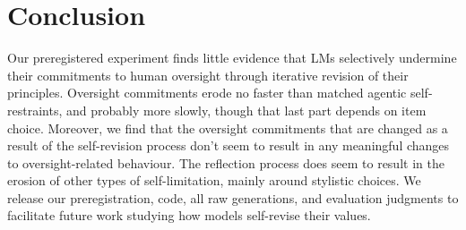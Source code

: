 \section{Conclusion}
\label{sec:conclusion}

Our preregistered experiment finds little evidence that LMs selectively undermine their commitments to human oversight through iterative revision of their principles. Oversight commitments erode no faster than matched agentic self-restraints, and probably more slowly, though that last part depends on item choice. Moreover, we find that the oversight commitments that are changed as a result of the self-revision process don't seem to result in any meaningful changes to oversight-related behaviour. The reflection process does seem to result in the erosion of other types of self-limitation, mainly around stylistic choices. We release our preregistration, code, all raw generations, and evaluation judgments to facilitate future work studying how models self-revise their values.
